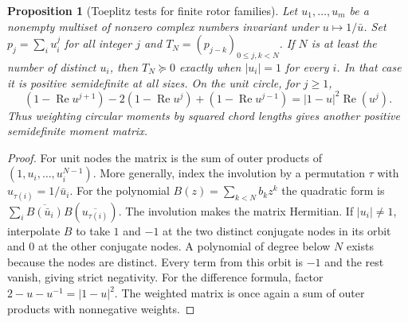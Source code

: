 \documentclass[11pt,reqno]{amsart}
\newtheorem{proposition}[theorem]{Proposition}
\theoremstyle{definition}
\theoremstyle{remark}
\numberwithin{equation}{section}
\begin{document}
\begin{proposition}[Toeplitz tests for finite rotor families]\label{m8:toeplitz}
Let $u_1,\ldots,u_m$ be a nonempty multiset of nonzero complex
numbers invariant under $u\mapsto1/\bar u$. Set
$p_j=\sum_i u_i^j$ for all integer $j$ and
$T_N=(p_{j-k})_{0\le j,k<N}$. If $N$ is at least the number of
distinct $u_i$, then $T_N\succeq0$ exactly when $|u_i|=1$
for every $i$. In that case it is positive semidefinite at all
sizes. On the unit circle, for $j\ge1$,
\[
 (1-\operatorname{Re}u^{j+1})-2(1-\operatorname{Re}u^j)
       +(1-\operatorname{Re}u^{j-1})
     =|1-u|^2\operatorname{Re}(u^j).
\]
Thus weighting circular moments by squared chord lengths gives
another positive semidefinite moment matrix.
\end{proposition}
\begin{proof}
For unit nodes the matrix is the sum of outer products of
$(1,u_i,\ldots,u_i^{N-1})$. More generally, index the involution
by a permutation $\tau$ with $u_{\tau(i)}=1/\bar u_i$.
For the polynomial $B(z)=\sum_{k<N}b_k z^k$ the quadratic form
is $\sum_i\overline{B(\bar u_i)}B(\overline{u_{\tau(i)}})$.
The involution makes the matrix Hermitian. If $|u_i|\ne1$,
interpolate $B$ to take $1$ and $-1$ at the two distinct conjugate
nodes in its orbit and $0$ at the other conjugate nodes.
A polynomial of degree below $N$ exists because the nodes are
distinct. Every term from this orbit is $-1$ and the rest
vanish, giving strict negativity. For the difference formula,
factor $2-u-u^{-1}=|1-u|^2$. The weighted matrix is once
again a sum of outer products with nonnegative weights.
\end{proof}
\end{document}
